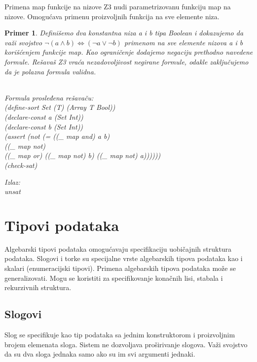\documentclass[12pt,oneside]{memoir}
\newtheorem{primer}{Primer}
\begin{document}
Primena map funkcije na nizove
Z3 nudi parametrizovanu funkciju map na nizove. Omogućava primenu proizvoljnih funkcija na sve elemente niza.
\begin{primer} Definišemo dva konstantna niza a i b tipa Boolean i dokazujemo da važi svojstvo $\neg{(a \land b)} \Leftrightarrow (\neg{a} \lor \neg{b}) $ primenom na sve elemente nizova a i b korišćenjem funkcije map. Kao ograničenje dodajemo negaciju prethodno navedene formule. Rešavaš Z3 vraća nezadovoljivost negirane formule, odakle zaključujemo da je polazna formula validna.\\ \\
\begin{minipage}[b]{0.5\textwidth}
Formula prosleđena rešavaču:
\\(define-sort Set (T) (Array T Bool))
\\(declare-const a (Set Int))
\\(declare-const b (Set Int))
\\(assert (not (= ((\_ map and) a b) 
\\((\_ map not) 
\\((\_ map or) ((\_ map not) b) ((\_ map not) a))))))
\\(check-sat)
\end{minipage}
\hspace{2.5cm} 
\begin{minipage}[t]{0.5\textwidth}
\vspace{-5.3cm}
Izlaz:
\\unsat 
\end{minipage}
\end{primer}

\section{Tipovi podataka} \label{sec:num3}

Algebarski tipovi podataka omogućavaju specifikaciju uobičajnih struktura podataka. Slogovi i torke su specijalne vrste algebarskih tipova podataka kao i skalari (enumeracijski tipovi). Primena algebarskih tipova podataka može se generalizovati. Mogu se koristiti za specifikovanje konačnih lisi, stabala i rekurzivnih struktura. 
\subsection{Slogovi}
Slog se specifikuje kao tip podataka sa jednim konstruktorom i proizvoljnim brojem elemenata sloga. Sistem ne dozvoljava proširivanje slogova. Važi svojstvo da su dva sloga jednaka samo ako su im svi argumenti jednaki.
\end{document}
